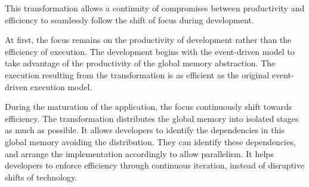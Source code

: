 This transformation allows a continuity of compromises between productivity and efficiency to seamlessly follow the shift of focus during development.






At first, the focus remains on the productivity of development rather than the efficiency of execution.
The development begins with the event-driven model to take advantage of the productivity of the global memory abstraction.
The execution resulting from the transformation is as efficient as the original event-driven execution model.


During the maturation of the application, the focus continuously shift towards efficiency.
The transformation distributes the global memory into isolated stages as much as possible.
It allows developers to identify the dependencies in this global memory avoiding the distribution.
They can identify these dependencies, and arrange the implementation accordingly to allow parallelism.
It helps developers to enforce efficiency through continuous iteration, instead of disruptive shifts of technology.

